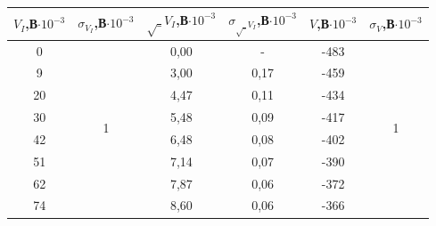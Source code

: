 \documentclass[a4paper,12pt]{report}
\begin{document}
\begin{table}[H]
\begin{tabular}{|c|c|c|c|c|c|}
\hline
$V_{I}$,В$\cdot10^{-3}$ & $\sigma_{V_I}$,В$\cdot10^{-3}$ & $\sqrt_{V_I}$,В$\cdot10^{-3}$ & $\sigma_{\sqrt_{V_I}}$,В$\cdot10^{-3}$ & $V$,В$\cdot10^{-3}$ & $\sigma_{V}$,В$\cdot10^{-3}$  \\ \hline
0                             & \multirow{14}{*}{1}                   & 0,00                              & -                                 & -483                         & \multirow{14}{*}{1}                  \\ \cline{1-1} \cline{3-5}
9                             &                                       & 3,00                              & 0,17                              & -459                         &                                      \\ \cline{1-1} \cline{3-5}
20                            &                                       & 4,47                              & 0,11                              & -434                         &                                      \\ \cline{1-1} \cline{3-5}
30                            &                                       & 5,48                              & 0,09                              & -417                         &                                      \\ \cline{1-1} \cline{3-5}
42                            &                                       & 6,48                              & 0,08                              & -402                         &                                      \\ \cline{1-1} \cline{3-5}
51                            &                                       & 7,14                              & 0,07                              & -390                         &                                      \\ \cline{1-1} \cline{3-5}
62                            &                                       & 7,87                              & 0,06                              & -372                         &                                      \\ \cline{1-1} \cline{3-5}
74                            &                                       & 8,60                              & 0,06                              & -366                         &                                      \\ \cline{1-1} \cline{3-5}

\end{tabular}
\end{table}
\end{document}
